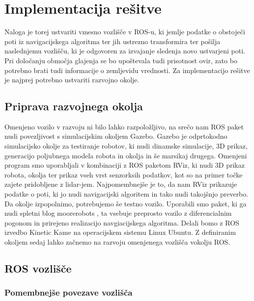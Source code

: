 \chapter{Implementacija rešitve}\label{cha:rezultati}

Naloga je torej ustvariti vmesno vozlišče v ROS-u, ki jemlje podatke o obstoječi poti iz navigacijskega algoritma ter jih ustrezno transformira ter pošilja naslednjemu vozlišču, ki je odgovoren za izvajanje sledenja novo ustvarjeni poti. Pri določanju območja glajenja se bo upoštevala tudi prisotnost ovir, zato bo potrebno brati tudi informacije o zemljevidu vrednosti. Za implementacijo rešitve je najprej potrebno ustvariti razvojno okolje.

\section{Priprava razvojnega okolja}

Omenjeno vozilo v razvoju ni bilo lahko razpoložljivo, na srečo nam ROS paket nudi povezljivost s simulacijskim okoljem Gazebo. Gazebo je odprtokodno simulacijsko okolje za testiranje robotov, ki nudi dinamske simulacije, 3D prikaz, generacijo poljubnega modela robota in okolja in še marsikaj drugega. Omenjeni program smo uporabljali v kombinaciji z ROS paketom RViz, ki nudi 3D prikaz robota, okolja ter prikaz vseh vrst senzorksih podatkov, kot so na primer točke zajete pridobljene z lidar-jem. Najpomembnejše je to, da nam RViz prikazuje podatke o poti, ki jo nudi navigacijski algoritem in tako nudi takojšnjo preverbo. Da okolje izpopolnimo, potrebujemo še testno vozilo. Uporabili smo paket, ki ga nudi spletni blog moorerobots \cite{vir10}, ta vsebuje preprosto vozilo z diferencialnim pogonom in prirejeno realizacijo navgiacijskega algoritma. Delali bomo z ROS izvedbo Kinetic Kame na operacijskem sistemu Linux Ubuntu. Z definiranim okoljem sedaj lahko začnemo na razvoju omenjenega vozlišča vokolju ROS.

\section{ROS vozlišče}

\subsection{Pomembnejše povezave vozlišča}


